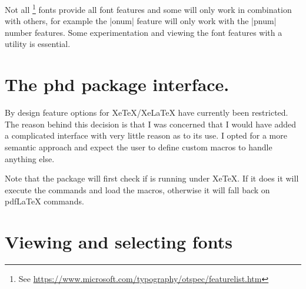 Not all \OpenType\footnote{See \protect\url{https://www.microsoft.com/typography/otspec/featurelist.htm}} fonts provide all font features and some will only work in combination with others, for example the |onum| feature will only work with the |pnum| number features. Some experimentation and viewing the font features with a utility is essential.

\fi\fi


\section{The phd package interface.}

By design feature options for XeTeX/XeLaTeX have currently been restricted. The reason behind this decision is that I was concerned that I would have added a complicated interface with very little reason as to its use. I opted for a more semantic approach and expect the user to define custom macros to handle anything else.
\medskip


Note that the package will first check if is running under XeTeX. If it does it will execute the commands and load the macros, otherwise it will fall back on pdfLaTeX commands.

\section{Viewing and selecting fonts}

